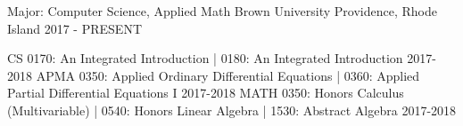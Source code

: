 \begin{cventries}
  \cventry
    {Major: Computer Science, Applied Math}
    {Brown University}
    {Providence, Rhode Island}
    {2017 - PRESENT}
    {
        \vspace{-2em}
        \begin{cvhonors}
			\cvhonor
			{CS}
			{0170: An Integrated Introduction | 0180: An Integrated Introduction}
			{}
			{2017-2018}
			\cvhonor
			{APMA}
			{0350: Applied Ordinary Differential Equations | 0360: Applied Partial Differential Equations I}
			{}
			{2017-2018}
			\cvhonor
			{MATH}
			{0350: Honors Calculus (Multivariable) | 0540: Honors Linear Algebra | 1530: Abstract Algebra}
			{}
			{2017-2018}
        \end{cvhonors}
		\vspace{-1em}
    }
\end{cventries}


